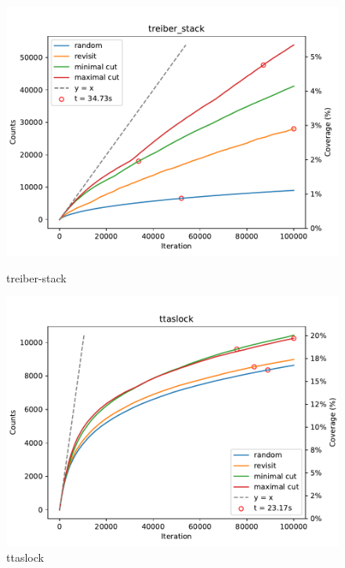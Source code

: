 \begin{figure}[h!]
	\begin{minipage}{0.45\textwidth}
		\centering
		\includegraphics[width=\textwidth]{figure/genmc/treiber_stack.pdf}
		\caption{treiber-stack}
		\label{genmc:treiber_stack}
	\end{minipage}
	\hfill
	\begin{minipage}{0.45\textwidth}
		\centering
		\includegraphics[width=\textwidth]{figure/genmc/ttaslock.pdf}
		\caption{ttaslock}
		\label{genmc:ttaslock}
	\end{minipage}

\end{figure}




